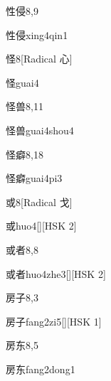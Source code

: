\begin{entry}{性侵}{8,9}
  \begin{phonetics}{性侵}{xing4qin1}
  \end{phonetics}
\end{entry}

\begin{entry}{怪}{8}[Radical 心]
  \begin{phonetics}{怪}{guai4}
  \end{phonetics}
\end{entry}

\begin{entry}{怪兽}{8,11}
  \begin{phonetics}{怪兽}{guai4shou4}
  \end{phonetics}
\end{entry}

\begin{entry}{怪癖}{8,18}
  \begin{phonetics}{怪癖}{guai4pi3}
  \end{phonetics}
\end{entry}

\begin{entry}{或}{8}[Radical 戈]
  \begin{phonetics}{或}{huo4}[][HSK 2]
  \end{phonetics}
\end{entry}

\begin{entry}{或者}{8,8}
  \begin{phonetics}{或者}{huo4zhe3}[][HSK 2]
  \end{phonetics}
\end{entry}

\begin{entry}{房子}{8,3}
  \begin{phonetics}{房子}{fang2zi5}[][HSK 1]
  \end{phonetics}
\end{entry}

\begin{entry}{房东}{8,5}
  \begin{phonetics}{房东}{fang2dong1}
  \end{phonetics}
\end{entry}

